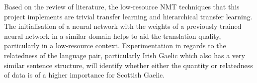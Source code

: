 Based on the review of literature, the low-resource \acrshort{NMT} techniques that this project implements are trivial transfer learning and hierarchical transfer learning. The initialisation of a neural network with the weights of a previously trained neural network in a similar domain helps to aid the translation quality, particularly in a low-resource context. Experimentation in regards to the relatedness of the language pair, particularly Irish Gaelic which also has a very similar sentence structure, will identify whether either the quantity or relatedness of data is of a higher importance for Scottish Gaelic.


